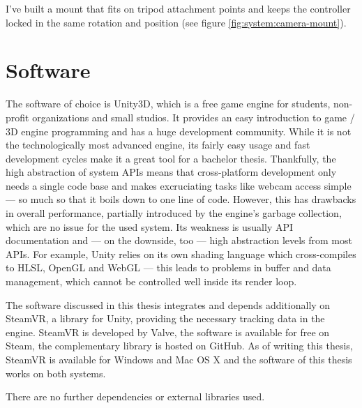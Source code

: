 I've built a mount that fits on tripod attachment points and keeps the 
controller locked in the same rotation and position (see figure 
\ref{fig:system:camera-mount}).



\section{Software}

The software of choice is Unity3D, which is a free game engine for students, 
non-profit organizations and small studios. It provides an easy introduction to 
game / 3D engine programming and has a huge development community. While it is 
not the technologically most advanced engine, its fairly easy usage and fast 
development cycles make it a great tool for a bachelor thesis.
\newline
Thankfully, the high abstraction of system APIs means that cross-platform 
development only needs a single code base and makes excruciating tasks like 
webcam access simple --- so much so that it boils down to one line of code. 
However, this has drawbacks in overall performance, partially introduced by the 
engine's garbage collection, which are no issue for the used system.
\newline
Its weakness is usually API documentation and --- on the downside, too --- high 
abstraction levels from most APIs. For example, Unity relies on its own shading 
language which cross-compiles to HLSL, OpenGL and WebGL --- this leads to 
problems in buffer and data management, which cannot be controlled well inside 
its render loop.

The software discussed in this thesis integrates and depends additionally on 
SteamVR, a library for Unity, providing the necessary tracking data in the 
engine. SteamVR is developed by Valve, the software is available for free on 
Steam, the complementary library is hosted on GitHub. As of writing this 
thesis, SteamVR is available for Windows and Mac OS X and the software of this 
thesis works on both systems. 

There are no further dependencies or external libraries used.